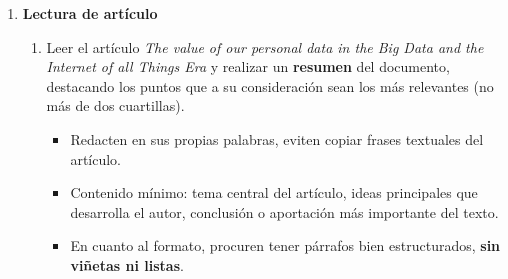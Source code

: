 \documentclass[12pt]{report}
\begin{document}
\begin{enumerate}[label=\textbf{\arabic*.}, leftmargin=*]
\begin{enumerate}[label=\textbf{\alph*.}, leftmargin=*, itemsep=1.0em]
\item A lo largo del tiempo han existido diversos \textit{modelos de datos}, como el modelo jer\'arquico, el modelo de red, el modelo relacional, el modelo orientado a objetos y los modelos NoSQL (llave--valor, documento, columnares, grafos). Responde lo siguiente:
\begin{itemize}
  \item Elabora una \textbf{tabla comparativa} entre al menos cuatro modelos de datos, destacando sus principales caracter\'isticas, ventajas, desventajas y casos de uso t\'ipicos.
  \item ¿Por qu\'e crees que el modelo relacional se convirti\'o en el m\'as ampliamente adoptado durante d\'ecadas?
  \item ¿En qu\'e contextos actuales, los modelos NoSQL superan al modelo relacional en eficiencia o flexibilidad? Justifica con ejemplos.
\end{itemize}

\item Sup\'on que deseas crear una aplicaci\'on para \textit{gesti\'on hospitalaria}. Considera cada una de las desventajas indicadas en el documento \textit{``Purpose of Database Systems''}, cuando se administran los datos en un sistema de archivos. Discute la relevancia de cada uno de los puntos indicados con respecto a la gesti\'on de datos de pacientes: historial m\'edico, diagn\'osticos, tratamientos, citas, acceso a registros m\'edicos, m\'edicos, especialidades, entre otros.
\end{enumerate}
\newpage
\item \textbf{Lectura de art\'iculo}

\begin{enumerate}[label=\textbf{\alph*.}, leftmargin=*, itemsep=1.0em]

\item Leer el art\'iculo \textit{The value of our personal data in the Big Data and the Internet of all Things Era} y realizar un \textbf{resumen} del documento, destacando los puntos que a su consideraci\'on sean los m\'as relevantes (no m\'as de dos cuartillas).
\begin{itemize}
  \item Redacten en sus propias palabras, eviten copiar frases textuales del art\'iculo.
  \item Contenido m\'inimo: tema central del art\'iculo, ideas principales que desarrolla el autor, conclusi\'on o aportaci\'on m\'as importante del texto.
  \item En cuanto al formato, procuren tener p\'arrafos bien estructurados, \textbf{sin vi\~netas ni listas}.
\end{itemize}


\end{enumerate}
\end{enumerate}
\end{document}

